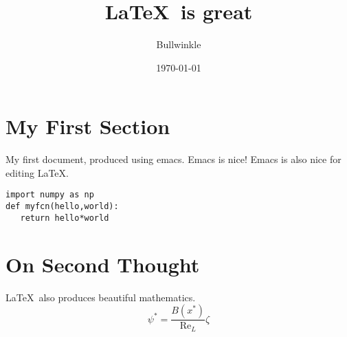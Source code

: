 \documentclass{article}
\begin{document}
\title{\LaTeX\ is great}
\author{Bullwinkle}
\date{\today}
\maketitle

\tableofcontents

\section{My First Section}

My first document, produced using emacs.  Emacs is nice!
Emacs is also nice for editing \LaTeX.

\begin{verbatim}
import numpy as np
def myfcn(hello,world):
   return hello*world
\end{verbatim}

\section{On Second Thought}

\LaTeX\ also  produces beautiful mathematics.
\begin{equation}
\psi^\ast = \frac{B(x^\ast)}{\mathrm{Re}_L}\zeta
\end{equation}
\end{document}
